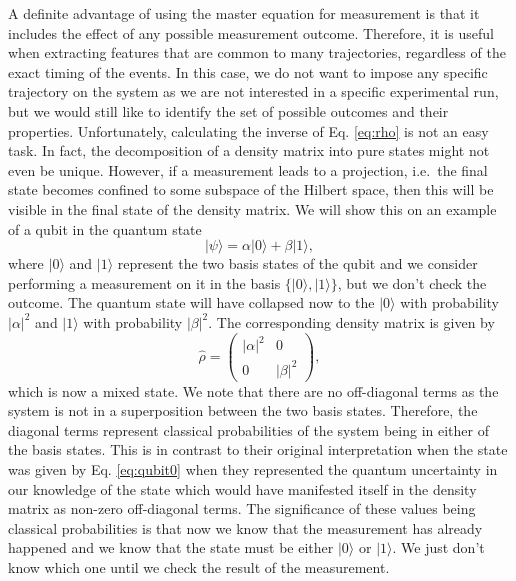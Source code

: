 A definite advantage of using the master equation for measurement is
that it includes the effect of any possible measurement
outcome. Therefore, it is useful when extracting features that are
common to many trajectories, regardless of the exact timing of the
events. In this case, we do not want to impose any specific trajectory
on the system as we are not interested in a specific experimental run,
but we would still like to identify the set of possible outcomes and
their properties. Unfortunately, calculating the inverse of
Eq. \eqref{eq:rho} is not an easy task. In fact, the decomposition of
a density matrix into pure states might not even be unique. However,
if a measurement leads to a projection, i.e.~the final state becomes
confined to some subspace of the Hilbert space, then this will be
visible in the final state of the density matrix. We will show this on
an example of a qubit in the quantum state
\begin{equation}
  \label{eq:qubit0}
  | \psi \rangle = \alpha |0 \rangle + \beta | 1 \rangle,
\end{equation}
where $| 0 \rangle$ and $| 1 \rangle$ represent the two basis states
of the qubit and we consider performing a measurement on it in the
basis $\{| 0 \rangle, | 1 \rangle \}$, but we don't check the outcome.
The quantum state will have collapsed now to the $ | 0 \rangle$ with
probability $| \alpha |^2$ and $| 1 \rangle$ with probability
$| \beta |^2$. The corresponding density matrix is given by
\begin{equation}
  \label{eq:rho1}
  \hat{\rho} = \left( \begin{array}{cc}
                        | \alpha |^2 & 0 \\
                        0 & |\beta|^2 
                      \end{array} \right),
\end{equation}
which is now a mixed state. We note that there are no off-diagonal
terms as the system is not in a superposition between the two basis
states. Therefore, the diagonal terms represent classical
probabilities of the system being in either of the basis states. This
is in contrast to their original interpretation when the state was
given by Eq. \eqref{eq:qubit0} when they represented the quantum
uncertainty in our knowledge of the state which would have manifested
itself in the density matrix as non-zero off-diagonal terms. The
significance of these values being classical probabilities is that now
we know that the measurement has already happened and we know that the
state must be either $| 0 \rangle$ or $| 1 \rangle$. We just don't
know which one until we check the result of the measurement.

